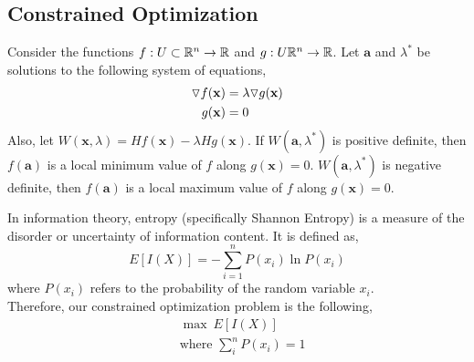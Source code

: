 \documentclass[12pt]{article}
\begin{document}
\subsection{Constrained Optimization}

 Consider the functions $f:U\subset\mathbb{R}^n\rightarrow\mathbb{R}$ and $g:U\mathbb{R}^n\rightarrow\mathbb{R}$. Let $\mathbf{a}$ and $\lambda^*$ be solutions to the following system of equations,
\begin{align*}
\triangledown f(\mathbf{x}) &= \lambda\triangledown g(\mathbf{x}) \\
g(\mathbf{x}) &= 0
\end{align*}
Also, let $W(\mathbf{x},\lambda) = Hf(\mathbf{x})-\lambda Hg(\mathbf{x})$. If $W(\mathbf{a},\lambda^*)$ is positive definite, then $f(\mathbf{a})$ is a local minimum value of $f$ along $g(\mathbf{x}) = 0$. $W(\mathbf{a},\lambda^*)$ is negative definite, then $f(\mathbf{a})$ is a local maximum value of $f$ along $g(\mathbf{x}) = 0$.

 In information theory, entropy (specifically Shannon Entropy) is a measure of the disorder or uncertainty of information content. It is defined as,
\[
E[I(X)] = -\sum_{i=1}^{n} P(x_i)\ln P(x_i)
\]
where $P(x_i)$ refers to the probability of the random variable $x_i$.  \\

 Therefore, our constrained optimization problem is the following,
\begin{align*}
& \max\ E[I(X)] \\
& \mbox{where } \sum_{i}^{n} P(x_i) = 1
\end{align*}
\end{document}
